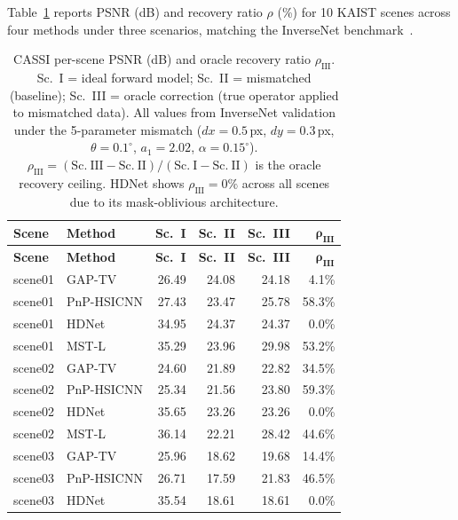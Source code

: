 \documentclass[11pt]{article}
\theoremstyle{definition}
\begin{document}
Table~\ref{tab:cassi_scenes} reports PSNR (dB) and recovery ratio $\rho$ (\%) for 10 KAIST scenes across
four methods under three scenarios, matching the InverseNet benchmark~\cite{yang2026inversenet}.

\begin{footnotesize}
\begin{longtable}{l l r r r r}
\caption{CASSI per-scene PSNR (dB) and oracle recovery ratio $\rho_{\mathrm{III}}$.  Sc.~I = ideal forward model;
Sc.~II = mismatched (baseline); Sc.~III = oracle correction (true operator applied to mismatched data).
All values from InverseNet validation under the 5-parameter mismatch ($dx{=}0.5$\,px, $dy{=}0.3$\,px, $\theta{=}0.1^\circ$, $a_1{=}2.02$, $\alpha{=}0.15^\circ$).
$\rho_{\mathrm{III}} = (\mathrm{Sc.~III} - \mathrm{Sc.~II}) / (\mathrm{Sc.~I} - \mathrm{Sc.~II})$ is the oracle recovery ceiling.
HDNet shows $\rho_{\mathrm{III}}{=}0\%$ across all scenes due to its mask-oblivious architecture.}
\label{tab:cassi_scenes} \\
\toprule
\textbf{Scene} & \textbf{Method} &
  \textbf{Sc.~I} & \textbf{Sc.~II} & \textbf{Sc.~III} & $\boldsymbol{\rho}_{\textbf{III}}$ \\
\midrule
\endfirsthead
\toprule
\textbf{Scene} & \textbf{Method} &
  \textbf{Sc.~I} & \textbf{Sc.~II} & \textbf{Sc.~III} & $\boldsymbol{\rho}_{\textbf{III}}$ \\
\midrule
\endhead
\bottomrule
\endlastfoot
scene01 & GAP-TV        & 26.49 & 24.08 & 24.18 & 4.1\% \\
scene01 & PnP-HSICNN    & 27.43 & 23.47 & 25.78 & 58.3\% \\
scene01 & HDNet         & 34.95 & 24.37 & 24.37 & 0.0\% \\
scene01 & MST-L         & 35.29 & 23.96 & 29.98 & 53.2\% \\
\midrule
scene02 & GAP-TV        & 24.60 & 21.89 & 22.82 & 34.5\% \\
scene02 & PnP-HSICNN    & 25.34 & 21.56 & 23.80 & 59.3\% \\
scene02 & HDNet         & 35.65 & 23.26 & 23.26 & 0.0\% \\
scene02 & MST-L         & 36.14 & 22.21 & 28.42 & 44.6\% \\
\midrule
scene03 & GAP-TV        & 25.96 & 18.62 & 19.68 & 14.4\% \\
scene03 & PnP-HSICNN    & 26.71 & 17.59 & 21.83 & 46.5\% \\
scene03 & HDNet         & 35.54 & 18.61 & 18.61 & 0.0\% \\

\end{longtable}
\end{footnotesize}
\end{document}
